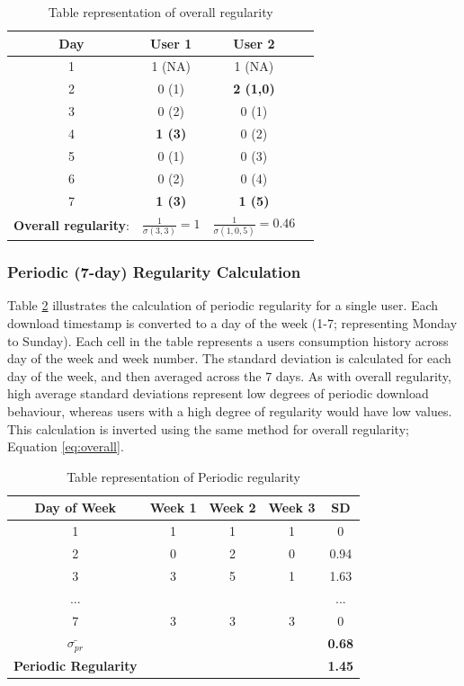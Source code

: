 \documentclass[a4paper]{article}
\begin{document}
\begin{table}[h!]
\centering
\begin{tabular}{|c|c|c|c|}
\hline
Day & User 1 & User 2 \\
\hline
1 & 1 (NA)  & 1 (NA) \\
\hline
2 & 0 (1) & \textbf{2 (1,0)} \\
\hline
3 & 0 (2) & 0 (1) \\
\hline
4 & \textbf{1 (3)} & 0 (2) \\
\hline
5 & 0 (1) & 0 (3) \\
\hline
6 & 0 (2) & 0 (4) \\
\hline
7 & \textbf{1 (3)} & \textbf{1 (5)} \\
\hline
\hline
\textbf{Overall regularity}: & $\frac{1}{\sigma (3,3)}=1$ &  $\frac{1}{\sigma (1,0,5)}=0.46$ \\
\hline
\end{tabular}
\caption[Overall Regularity Example]{Table representation of overall regularity\label{tab:overall}}
\end{table}

\subsubsection{Periodic (7-day) Regularity Calculation}\label{app:preg}
Table \ref{tab:period} illustrates the calculation of periodic regularity for a single user. Each download timestamp is converted to a day of the week (1-7; representing Monday to Sunday). Each cell in the table represents a users consumption history across day of the week and week number. The standard deviation is calculated for each day of the week, and then averaged across the 7 days. As with overall regularity, high average standard deviations represent low degrees of periodic download behaviour, whereas users with a high degree of regularity would have low values.  This calculation is inverted using the same method for overall regularity; Equation \ref{eq:overall}.

\begin{table}[h!]
\centering
\begin{tabular}{|c|c|c|c|c|}
\hline
Day of Week & Week 1 & Week 2 & Week 3 &  SD \\
\hline
1 & 1 & 1 & 1 & 0 \\
2 & 0 & 2 & 0 & 0.94 \\
3 & 3 & 5 & 1 & 1.63 \\
... & & & & ...\\
7 & 3 & 3 & 3 &  0 \\
\hline
\hline
\textbf{$\bar{\sigma_{pr}}$} &&&& \textbf{0.68} \\
\textbf{Periodic Regularity} &&&& \textbf{1.45} \\
\hline
\end{tabular}
\caption[Periodic Regularity Example]{Table representation of Periodic regularity \label{tab:period}}
\end{table}
\end{document}

